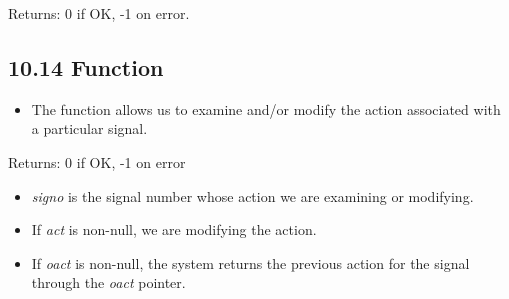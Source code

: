\documentclass[]{article}
\begin{document}


Returns: 0 if OK, -1 on error.

\subsection*{10.14  Function}
\begin{itemize}
\item The  function allows us to examine and/or modify the
action associated with a particular signal.
\end{itemize}



Returns: 0 if OK, -1 on error

\begin{itemize}
\item \emph{signo} is the signal number whose action we are examining or
modifying.
\item If \emph{act} is non-null, we are modifying the action.
\item If \emph{oact} is non-null, the system returns the previous action for the
signal through the \emph{oact} pointer.
\end{itemize}
\end{document}
